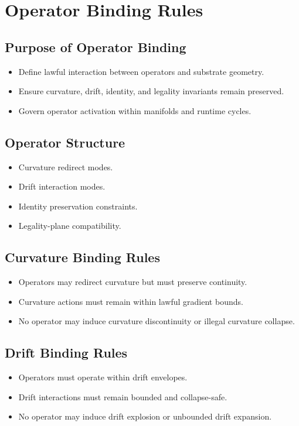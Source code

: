 \section{Operator Binding Rules}

\subsection{Purpose of Operator Binding}
\begin{itemize}
    \item Define lawful interaction between operators and substrate geometry.
    \item Ensure curvature, drift, identity, and legality invariants remain preserved.
    \item Govern operator activation within manifolds and runtime cycles.
\end{itemize}

\subsection{Operator Structure}
\begin{itemize}
    \item Curvature redirect modes.
    \item Drift interaction modes.
    \item Identity preservation constraints.
    \item Legality-plane compatibility.
\end{itemize}

\subsection{Curvature Binding Rules}
\begin{itemize}
    \item Operators may redirect curvature but must preserve continuity.
    \item Curvature actions must remain within lawful gradient bounds.
    \item No operator may induce curvature discontinuity or illegal curvature collapse.
\end{itemize}

\subsection{Drift Binding Rules}
\begin{itemize}
    \item Operators must operate within drift envelopes.
    \item Drift interactions must remain bounded and collapse-safe.
    \item No operator may induce drift explosion or unbounded drift expansion.
\end{itemize}

